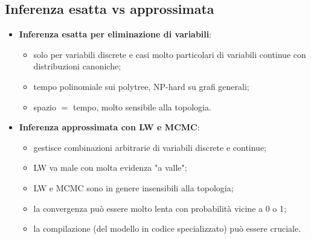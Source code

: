 
\subsection{Inferenza esatta vs approssimata}

\begin{itemize}
  \item \textbf{Inferenza esatta per eliminazione di variabili}:
    \begin{itemize}
      \item solo per variabili discrete e casi molto particolari di variabili
            continue con distribuzioni canoniche;
      \item tempo polinomiale sui polytree, NP-hard su grafi generali;
      \item spazio $=$ tempo, molto sensibile alla topologia.
    \end{itemize}
  \item \textbf{Inferenza approssimata con LW e MCMC}:
    \begin{itemize}
      \item gestisce combinazioni arbitrarie di variabili discrete e continue;
      \item LW va male con molta evidenza "a valle";
      \item LW e MCMC sono in genere insensibili alla topologia;
      \item la convergenza può essere molto lenta con probabilità vicine a 0 o 1;
      \item la compilazione (del modello in codice specializzato) può essere
            cruciale.
    \end{itemize}
\end{itemize}
